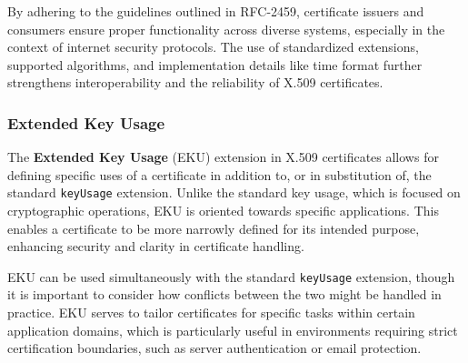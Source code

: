 By adhering to the guidelines outlined in RFC-2459, certificate 
issuers and consumers ensure proper functionality across diverse 
systems, especially in the context of internet security protocols. 
The use of standardized extensions, supported algorithms, and 
implementation details like time format further strengthens 
interoperability and the reliability of X.509 certificates.

\subsubsection{Extended Key Usage}

The \textbf{Extended Key Usage} (EKU) extension in X.509 certificates 
allows for defining specific uses of a certificate in addition to, 
or in substitution of, the standard \texttt{keyUsage} extension. 
Unlike the standard key usage, which is focused on cryptographic 
operations, EKU is oriented towards specific applications. This 
enables a certificate to be more narrowly defined for its intended 
purpose, enhancing security and clarity in certificate handling.

EKU can be used simultaneously with the standard \texttt{keyUsage} 
extension, though it is important to consider how conflicts between 
the two might be handled in practice. EKU serves to tailor 
certificates for specific tasks within certain application domains, 
which is particularly useful in environments requiring strict 
certification boundaries, such as server authentication or 
email protection.

